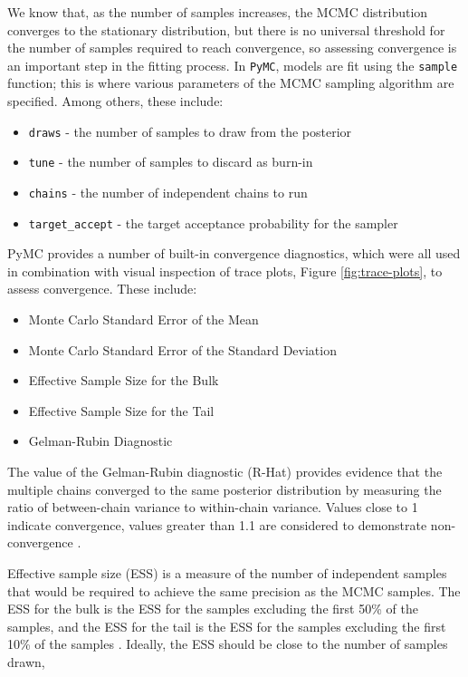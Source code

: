 We know that, as the number of samples increases, the MCMC distribution
converges to the stationary distribution, but there is no universal threshold
for the number of samples required to reach convergence, so assessing
convergence is an important step in the fitting process. In \texttt{PyMC},
models are fit using the \texttt{sample} function; this is where various
parameters of the MCMC sampling algorithm are specified. Among others, these
include:
\begin{itemize}
  \item \texttt{draws} - the number of samples to draw from the posterior
  \item \texttt{tune} - the number of samples to discard as burn-in \cite{burn-in}
  \item \texttt{chains} - the number of independent chains to run
  \item \texttt{target\_accept} - the target acceptance probability for the sampler
\end{itemize}
PyMC provides a number of built-in convergence diagnostics, which were all used
in combination with visual inspection of trace plots, Figure
\ref{fig:trace-plots}, to assess convergence. These include:
\begin{itemize}
  \item Monte Carlo Standard Error of the Mean
  \item Monte Carlo Standard Error of the Standard Deviation
  \item Effective Sample Size for the Bulk
  \item Effective Sample Size for the Tail
  \item Gelman-Rubin Diagnostic
\end{itemize}
The value of the Gelman-Rubin diagnostic (R-Hat) provides evidence that the multiple chains
converged to the same posterior distribution by measuring the ratio of between-chain variance to 
within-chain variance. Values close to 1 indicate convergence, values greater than 1.1 are 
considered to demonstrate non-convergence \cite{statrethinking}.

Effective sample size (ESS) is a measure of the number of independent samples 
that would be required to achieve the same precision as the MCMC samples.
The ESS for the bulk is the ESS for the samples excluding the first 50\% of the samples, 
and the ESS for the tail is the ESS for the samples excluding the first 10\% of the samples 
\cite{statrethinking}. Ideally, the ESS should be close to the number of samples drawn, 


